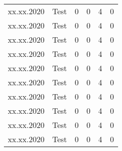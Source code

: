 \begin{landscape}
\begin{longtable}[c]{lp{10cm}rrrr}
	
	xx.xx.2020 
	& Test
	& 0 %
	& 0 %
	& 4 %
	& 0\\ %
	
	xx.xx.2020 
	& Test
	& 0 %
	& 0 %
	& 4 %
	& 0\\ %

	xx.xx.2020 
	& Test
	& 0 %
	& 0 %
	& 4 %
	& 0\\ %

	xx.xx.2020 
	& Test
	& 0 %
	& 0 %
	& 4 %
	& 0\\ %

	xx.xx.2020 
	& Test
	& 0 %
	& 0 %
	& 4 %
	& 0\\ %

	xx.xx.2020 
	& Test
	& 0 %
	& 0 %
	& 4 %
	& 0\\ %
	
	xx.xx.2020 
	& Test
	& 0 %
	& 0 %
	& 4 %
	& 0\\ %

	xx.xx.2020 
	& Test
	& 0 %
	& 0 %
	& 4 %
	& 0\\ %

	xx.xx.2020 
	& Test
	& 0 %
	& 0 %
	& 4 %
	& 0\\ %

	xx.xx.2020 
	& Test
	& 0 %
	& 0 %
	& 4 %
	& 0\\ %
	
\end{longtable}


\end{landscape}
